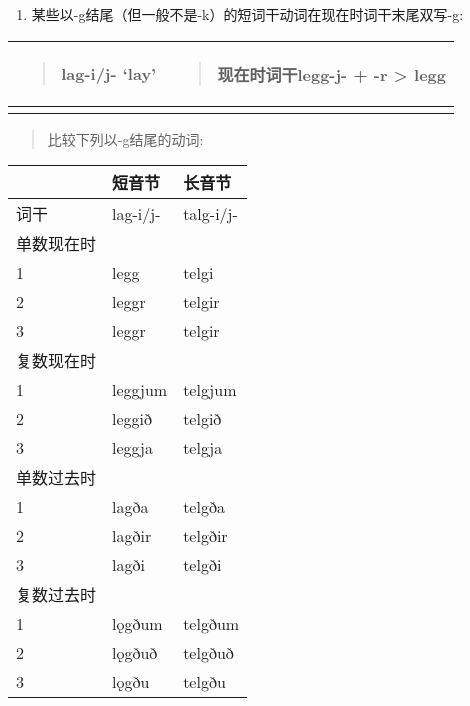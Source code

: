 \begin{enumerate}
  \def\labelenumi{\arabic{enumi})}
  \setcounter{enumi}{1}
  \item
        某些以-g结尾（但一般不是-k）的短词干动词在现在时词干末尾双写-g:
\end{enumerate}

\begin{longtable}{ll}
  \toprule
  \begin{quote}lag-i/j- `lay‌'\end{quote} & \begin{quote}现在时词干legg-j- + -r \textgreater{} legg\end{quote} \\
  \midrule
  \endhead
  \bottomrule
  \endfoot
\end{longtable}

\begin{quote}
  比较下列以-g结尾的动词:
\end{quote}

\begin{longtable}{lll}
  \toprule
        & 短音节      & 长音节       \\
  \midrule
  \endhead
  \bottomrule
  \endfoot
  词干    & lag-i/j- & talg-i/j- \\
  单数现在时 &          &           \\
  1     & legg     & telgi     \\
  2     & leggr    & telgir    \\
  3     & leggr    & telgir    \\
  复数现在时 &          &           \\
  1     & leggjum  & telgjum   \\
  2     & leggið   & telgið    \\
  3     & leggja   & telgja    \\
  单数过去时 &          &           \\
  1     & lagða    & telgða    \\
  2     & lagðir   & telgðir   \\
  3     & lagði    & telgði    \\
  复数过去时 &          &           \\
  1     & lǫgðum   & telgðum   \\
  2     & lǫgðuð   & telgðuð   \\
  3     & lǫgðu    & telgðu    \\
\end{longtable}

